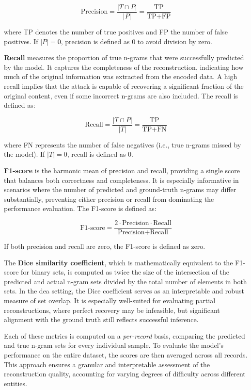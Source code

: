 \[
\text{Precision} = \frac{|T \cap P|}{|P|} = \frac{\text{TP}}{\text{TP} + \text{FP}}
\]

where TP denotes the number of true positives and FP the number of false positives. If $|P| = 0$, precision is defined as 0 to avoid division by zero.

\textbf{Recall} measures the proportion of true n-grams that were successfully predicted by the model.
It captures the completeness of the reconstruction, indicating how much of the original information was extracted from the encoded data.
A high recall implies that the attack is capable of recovering a significant fraction of the original content, even if some incorrect n-grams are also included.
The recall is defined as:

\[
\text{Recall} = \frac{|T \cap P|}{|T|} = \frac{\text{TP}}{\text{TP} + \text{FN}}
\]

where FN represents the number of false negatives (i.e., true n-grams missed by the model).
If $|T| = 0$, recall is defined as 0.

\textbf{F1-score} is the harmonic mean of precision and recall, providing a single score that balances both correctness and completeness.
It is especially informative in scenarios where the number of predicted and ground-truth n-grams may differ substantially, preventing either precision or recall from dominating the performance evaluation.
The F1-score is defined as:

\[
\text{F1-score} = \frac{2 \cdot \text{Precision} \cdot \text{Recall}}{\text{Precision} + \text{Recall}}
\]

If both precision and recall are zero, the F1-score is defined as zero.

The \textbf{Dice similarity coefficient}, which is mathematically equivalent to the F1-score for binary sets, is computed as twice the size of the intersection of the predicted and actual n-gram sets divided by the total number of elements in both sets.
In the \ac{dea} setting, the Dice coefficient serves as an interpretable and robust measure of set overlap.
It is especially well-suited for evaluating partial reconstructions, where perfect recovery may be infeasible, but significant alignment with the ground truth still reflects successful inference.

Each of these metrics is computed on a \emph{per-record} basis, comparing the predicted and true n-gram sets for every individual sample.
To evaluate the model's performance on the entire dataset, the scores are then averaged across all records.
This approach ensures a granular and interpretable assessment of the reconstruction quality, accounting for varying degrees of difficulty across different entities.

